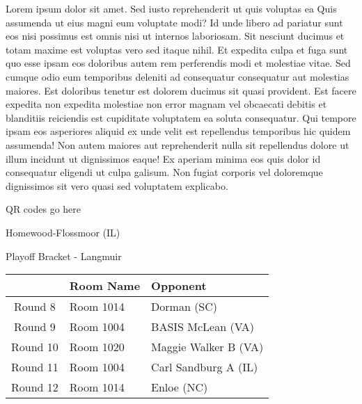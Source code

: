 \documentclass{article}%
\begin{document}
\vspace*{8pt}%
\linebreak%
\newline%
\newline%
Lorem ipsum dolor sit amet. Sed iusto reprehenderit ut quis voluptas ea Quis assumenda ut eius magni eum voluptate modi? Id unde libero ad pariatur sunt eos nisi possimus est omnis nisi ut internos laboriosam. Sit nesciunt ducimus et totam maxime est voluptas vero sed itaque nihil. Et expedita culpa et fuga sunt quo esse ipsam eos doloribus autem rem perferendis modi et molestiae vitae.\newline%
\newline%
Sed cumque odio eum temporibus deleniti ad consequatur consequatur aut molestias maiores. Est doloribus tenetur est dolorem ducimus sit quasi provident. Est facere expedita non expedita molestiae non error magnam vel obcaecati debitis et blanditiis reiciendis est cupiditate voluptatem ea soluta consequatur. Qui tempore ipsam eos asperiores aliquid ex unde velit est repellendus temporibus hic quidem assumenda!\newline%
\newline%
Non autem maiores aut reprehenderit nulla sit repellendus dolore ut illum incidunt ut dignissimos eaque! Ex aperiam minima eos quis dolor id consequatur eligendi ut culpa galisum. Non fugiat corporis vel doloremque dignissimos sit vero quasi sed voluptatem explicabo.\newline%
\newline%
%
\vspace*{30pt}%
\begin{center}%
\begin{Huge}%
QR codes go here%
\end{Huge}%
\end{center}%
\newpage%
\begin{center}%
\begin{Huge}%
Homewood{-}Flossmoor (IL)%
\end{Huge}%
\vspace*{8pt}%
\linebreak%
\begin{Large}%
Playoff Bracket {-} Langmuir%
\end{Large}%
\end{center}%
%
\begin{tabularx}{\textwidth}{|c|Y|Y|}%
\hline%
&Room Name&Opponent\\%
\hline%
Round 8&Room 1014&Dorman (SC)\\%
Round 9&Room 1004&BASIS McLean (VA)\\%
Round 10&Room 1020&Maggie Walker B (VA)\\%
Round 11&Room 1004&Carl Sandburg A (IL)\\%
Round 12&Room 1014&Enloe (NC)\\%
\hline%
\end{tabularx}%
\end{document}
